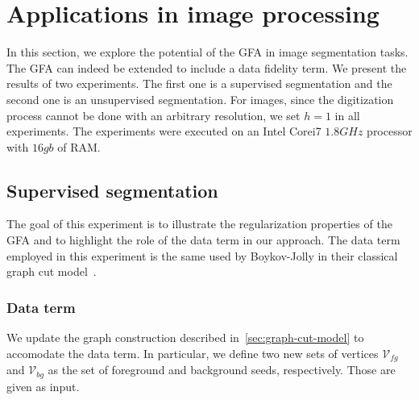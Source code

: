 \documentclass[review]{siamart220329}
\begin{document}
\section{Applications in image processing}

In this section, we explore the potential of the GFA in image segmentation tasks. The GFA can indeed be extended to include a data fidelity term.
We present the results of two experiments. The first one is a supervised segmentation and the second one is an unsupervised segmentation. For images, since the digitization process cannot be done with an arbitrary resolution, we set $h=1$ in all experiments. The experiments were executed on an Intel Corei7 $1.8GHz$ processor with $16gb$ of RAM.


\subsection{Supervised segmentation}

The goal of this experiment is to illustrate the regularization properties of the GFA and to highlight the role of the data term in our approach. The data term employed in this experiment is the same used by Boykov-Jolly in their classical graph cut model~\cite{boykov01graphcut}. 

\subsubsection{Data term}
We update the graph construction described in~\cref{sec:graph-cut-model} to accomodate the data term. In particular, we define two new sets of vertices $\mathcal{V}_{fg}$ and $\mathcal{V}_{bg}$ as the set of foreground and background seeds, respectively. Those are given as input.
\end{document}
